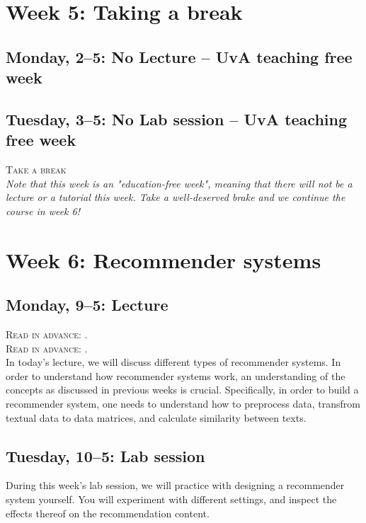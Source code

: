 {\section*{Week 5: Taking a break}

\subsection*{Monday, 2--5: No Lecture -- UvA teaching free week}

\subsection*{Tuesday, 3--5: No Lab session -- UvA teaching free week}

\textsc{ Take a break}\\

\emph{Note that this week is an "education-free week", meaning that there will not be a lecture or a tutorial this week. Take a well-deserved brake and we continue the course in week 6!}

\section*{Week 6: Recommender systems}

\subsection*{Monday, 9--5: Lecture}
\textsc{ Read in advance: \cite{Moller2018}.}\\
\textsc{ Read in advance: \cite{Loecherbach2020}.}\\

In today's lecture, we will discuss different types of recommender systems. In order to understand how recommender systems work, an understanding of the concepts as discussed in previous weeks is crucial. Specifically, in order to build a recommender system, one needs to understand how to preprocess data, transfrom textual data to data matrices, and calculate similarity between texts. 

\subsection*{Tuesday, 10--5: Lab session}
During this week's lab session, we will practice with designing a recommender system yourself. You will experiment with different settings, and inspect the effects thereof on the recommendation content. 

}
